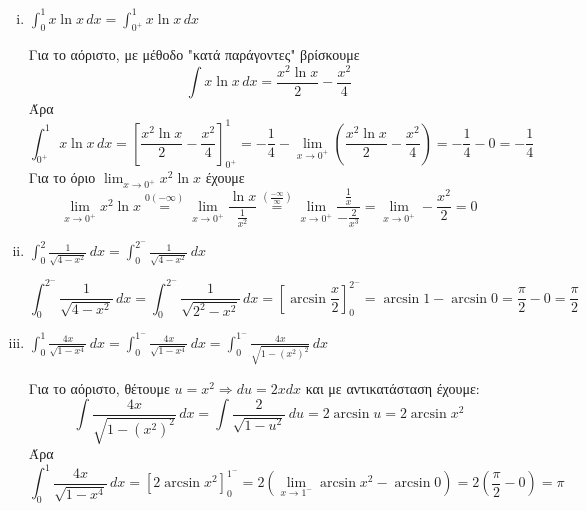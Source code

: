 \begin{enumerate}[i),start=12]
  \item $ \int _{0}^{1} x \ln{x} \,{dx} = \int _{0^{+}}^{1} x \ln{x} \,{dx}  $
    \begin{solution}
      Για το αόριστο, με μέθοδο "κατά παράγοντες" βρίσκουμε
      \[
        \int x \ln{x} \,{dx} = \frac{x^{2} \ln{x}}{2} - \frac{x^{2}}{4}
      \] 
      Άρα
      \[
        \int _{0^{+}}^{1} x \ln{x} \,{dx} = \left[\frac{x^{2} \ln{x}}{2} -
          \frac{x^{2}}{4}\right]_{0^{+}}^{1} = -\frac{1}{4} - \lim_{x \to 0^{+}} \left(
        \frac{x^{2} \ln{x}}{2} - \frac{x^{2}}{4}\right) = - \frac{1}{4} - 0 = -
        \frac{1}{4}
      \] 
      Για το όριο $ \lim_{x \to 0^{+}} x^{2} \ln{x} $ έχουμε
      \[
        \lim_{x \to 0^{+}} x^{2} \ln{x} \overset{0 (- \infty)}{=} 
        \lim_{x \to 0^{+}} \frac{\ln{x}}{\frac{1}{x^{2}}} 
        \overset{(\frac{- \infty}{\infty})}{=}  
        \lim_{x \to 0^{+}} \frac{\frac{1}{x}}{-\frac{2}{x^{3}}} = \lim_{x \to 0^{+}} 
        - \frac{x^{2}}{2} = 0
      \] 
    \end{solution}

  \item $ \int _{0}^{2} \frac{1}{\sqrt{4-x^{2}}} \,{dx} = 
    \int _{0}^{2^{-}} \frac{1}{\sqrt{4-x^{2}}} \,{dx} $
    \begin{solution}
      \[
        \int _{0}^{2^{-}} \frac{1}{\sqrt{4-x^{2}}} \,{dx} = \int _{0}^{2^{-}}
        \frac{1}{\sqrt{2^{2}-x^{2}}}  \,{dx} = \left[\arcsin{\frac{x}{2}
      }\right]_{0}^{2^{-}} = \arcsin{1} - \arcsin{0} = \frac{\pi}{2} - 0 =
      \frac{\pi}{2}
      \]
    \end{solution}


  \item $ \int _{0}^{1} \frac{4x}{\sqrt{1 - x^{4}}} \,{dx} =  \int _{0}^{1^{-}}
    \frac{4x}{\sqrt{1 - x^{4}}} \,{dx} = \int _{0}^{1^{-}} \frac{4x}{\sqrt{1 -
      (x^{2})^{2}}} \,{dx} $ 
      \begin{solution}
        Για το αόριστο, θέτουμε $ u = x^{2} \Rightarrow du = 2x dx $
        και με αντικατάσταση έχουμε:
        \[
          \int \frac{4x}{\sqrt{1 -(x^{2})^{2}} } \,{dx} = \int \frac{2}{ \sqrt{1 -u^{2}}}
          \,{du} = 2 \arcsin{u} = 2 \arcsin{x^{2}}
        \] 
        Άρα
        \[
          \int _{0}^{1} \frac{4x}{\sqrt{1 - x^{4}}} \,{dx} = [2
          \arcsin{x^{2}}]_{0}^{1^{-}} = 2(\lim_{x \to 1^{-}} \arcsin{x^{2}} - \arcsin{0})
          = 2\left( \frac{\pi}{2} - 0\right) = \pi
        \]
      \end{solution}
\end{enumerate}



